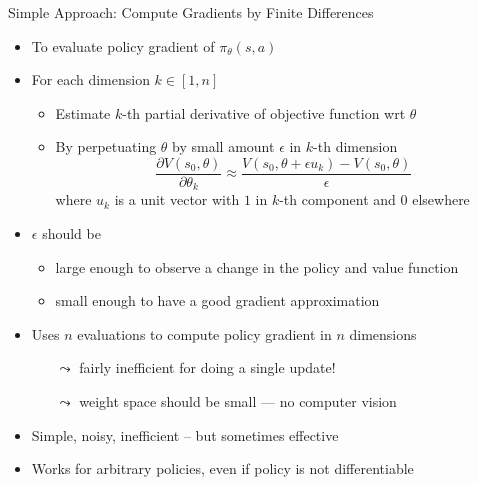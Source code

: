 \begin{frame}[c]{Simple Approach: Compute Gradients by Finite Differences}
	
	\begin{itemize}
		\item To evaluate policy gradient of $\pi_\theta(s,a)$
		\item For each dimension $k\in [1,n]$
		\begin{itemize}
			\item Estimate $k$-th partial derivative of objective function wrt $\theta$
			\item By perpetuating $\theta$ by small amount $\epsilon$ in $k$-th dimension
			$$\frac{\partial V(s_0, \theta)}{\partial \theta_k} \approx \frac{V(s_0, \theta + \epsilon u_k) - V(s_0, \theta)}{\epsilon} $$
			where $u_k$ is a unit vector with $1$ in $k$-th component and $0$ elsewhere
		\end{itemize}
		\pause
		\item $\epsilon$ should be
		\begin{itemize}
			\item large enough to observe a change in the policy and value function
			\item small enough to have a good gradient approximation
		\end{itemize}
		\pause
		\item Uses $n$ evaluations to compute policy gradient in $n$ dimensions
		\begin{itemize}
			\item[$\leadsto$] fairly inefficient for doing a single update!
			\item[$\leadsto$] weight space should be small --- no computer vision
		\end{itemize}
		\pause
		\item Simple, noisy, inefficient -- but sometimes effective
		\item Works for arbitrary policies, even if policy is not differentiable
	\end{itemize}
	
\end{frame}

